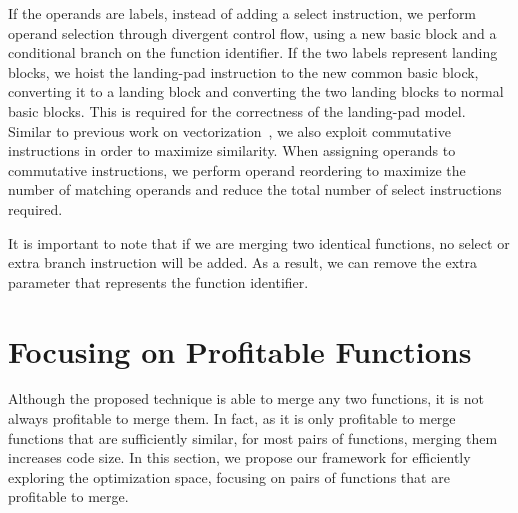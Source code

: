 If the operands are labels, instead of adding a select instruction, we perform
operand selection through divergent control flow, using a new basic
block and a conditional branch on the function identifier.
If the two labels represent landing blocks, we hoist the landing-pad
instruction to the new common basic block, converting it to a landing block and
converting the two landing blocks to normal basic blocks.
This is required for the correctness of the landing-pad model.
Similar to previous work on vectorization~\cite{porpodas18}, we
also exploit commutative instructions in order to maximize similarity.
When assigning operands to commutative instructions, we perform operand
reordering to maximize the number of matching operands and reduce the total
number of select instructions required.

It is important to note that if we are merging two identical functions, no
select or extra branch instruction will be added.
As a result, we can remove the extra parameter that represents the function
identifier.

\section{Focusing on Profitable Functions}
\label{sec:framework}


Although the proposed technique is able to merge any two functions, it is not always profitable to merge them. In fact, as it is only
profitable to merge functions that are sufficiently similar, for most pairs of functions, merging them increases code size.
In this section, we propose our framework for efficiently exploring the
optimization space, focusing on pairs of functions that are profitable to merge. 


